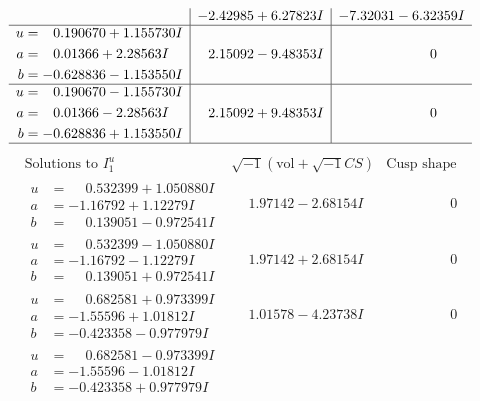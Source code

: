 \documentclass[1p]{elsarticle_modified}
\theoremstyle{definition}
\newcommand{\I}{\sqrt{-1}}
\begin{document}
$$\begin{array}{c|c|c}
 & -2.42985 + 6.27823 I & -7.32031 - 6.32359 I \\ \hline\begin{aligned}
u &= \phantom{-}0.190670 + 1.155730 I \\
a &= \phantom{-}0.01366 + 2.28563 I \\
b &= -0.628836 - 1.153550 I\end{aligned}
 & \phantom{-}2.15092 - 9.48353 I & \phantom{-0.000000 } 0 \\ \hline\begin{aligned}
u &= \phantom{-}0.190670 - 1.155730 I \\
a &= \phantom{-}0.01366 - 2.28563 I \\
b &= -0.628836 + 1.153550 I\end{aligned}
 & \phantom{-}2.15092 + 9.48353 I & \phantom{-0.000000 } 0\\
 \hline 
 \end{array}$$\newpage$$\begin{array}{c|c|c}  
\text{Solutions to }I^u_{1}& \I (\text{vol} + \sqrt{-1}CS) & \text{Cusp shape}\\
 \hline 
\begin{aligned}
u &= \phantom{-}0.532399 + 1.050880 I \\
a &= -1.16792 + 1.12279 I \\
b &= \phantom{-}0.139051 - 0.972541 I\end{aligned}
 & \phantom{-}1.97142 - 2.68154 I & \phantom{-0.000000 } 0 \\ \hline\begin{aligned}
u &= \phantom{-}0.532399 - 1.050880 I \\
a &= -1.16792 - 1.12279 I \\
b &= \phantom{-}0.139051 + 0.972541 I\end{aligned}
 & \phantom{-}1.97142 + 2.68154 I & \phantom{-0.000000 } 0 \\ \hline\begin{aligned}
u &= \phantom{-}0.682581 + 0.973399 I \\
a &= -1.55596 + 1.01812 I \\
b &= -0.423358 - 0.977979 I\end{aligned}
 & \phantom{-}1.01578 - 4.23738 I & \phantom{-0.000000 } 0 \\ \hline\begin{aligned}
u &= \phantom{-}0.682581 - 0.973399 I \\
a &= -1.55596 - 1.01812 I \\
b &= -0.423358 + 0.977979 I\end{aligned}

\end{array}$$
\end{document}
